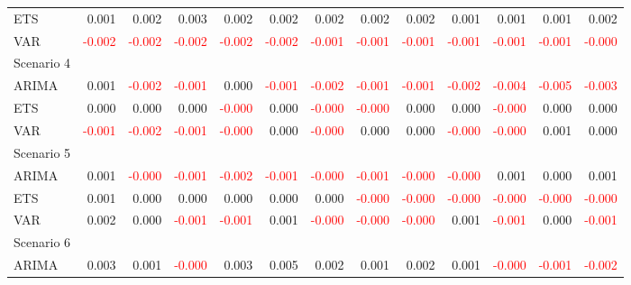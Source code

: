 \begin{table}[!htb]
{\begin{tabular}{lrrrrrrrrrrrr}
      ETS & 0.001 & 0.002 & 0.003 & 0.002 & 0.002 & 0.002 & 0.002 & 0.002 & 0.001 & 0.001 & 0.001 & 0.002 \\
      VAR & \textcolor{red}{-0.002} & \textcolor{red}{-0.002} & \textcolor{red}{-0.002} & \textcolor{red}{-0.002} & \textcolor{red}{-0.002} & \textcolor{red}{-0.001} & \textcolor{red}{-0.001} & \textcolor{red}{-0.001} & \textcolor{red}{-0.001} & \textcolor{red}{-0.001} & \textcolor{red}{-0.001} & \textcolor{red}{-0.000} \\
      \hline
      Scenario 4 & & & & & & & & & & & & \\
      \hline
      ARIMA & 0.001 & \textcolor{red}{-0.002} & \textcolor{red}{-0.001} & 0.000 & \textcolor{red}{-0.001} & \textcolor{red}{-0.002} & \textcolor{red}{-0.001} & \textcolor{red}{-0.001} & \textcolor{red}{-0.002} & \textcolor{red}{-0.004} & \textcolor{red}{-0.005} & \textcolor{red}{-0.003} \\
      ETS & 0.000 & 0.000 & 0.000 & \textcolor{red}{-0.000} & 0.000 & \textcolor{red}{-0.000} & \textcolor{red}{-0.000} & 0.000 & 0.000 & \textcolor{red}{-0.000} & 0.000 & 0.000 \\
      VAR & \textcolor{red}{-0.001} & \textcolor{red}{-0.002} & \textcolor{red}{-0.001} & \textcolor{red}{-0.000} & 0.000 & \textcolor{red}{-0.000} & 0.000 & 0.000 & \textcolor{red}{-0.000} & \textcolor{red}{-0.000} & 0.001 & 0.000 \\
      \hline
      Scenario 5 & & & & & & & & & & & & \\
      \hline
      ARIMA & 0.001 & \textcolor{red}{-0.000} & \textcolor{red}{-0.001} & \textcolor{red}{-0.002} & \textcolor{red}{-0.001} & \textcolor{red}{-0.000} & \textcolor{red}{-0.001} & \textcolor{red}{-0.000} & \textcolor{red}{-0.000} & 0.001 & 0.000 & 0.001 \\
      ETS & 0.001 & 0.000 & 0.000 & 0.000 & 0.000 & 0.000 & \textcolor{red}{-0.000} & \textcolor{red}{-0.000} & \textcolor{red}{-0.000} & \textcolor{red}{-0.000} & \textcolor{red}{-0.000} & \textcolor{red}{-0.000} \\
      VAR & 0.002 & 0.000 & \textcolor{red}{-0.001} & \textcolor{red}{-0.001} & 0.001 & \textcolor{red}{-0.000} & \textcolor{red}{-0.000} & \textcolor{red}{-0.000} & 0.001 & \textcolor{red}{-0.001} & 0.000 & \textcolor{red}{-0.001} \\
      \hline
      Scenario 6 & & & & & & & & & & & & \\
      \hline
      ARIMA & 0.003 & 0.001 & \textcolor{red}{-0.000} & 0.003 & 0.005 & 0.002 & 0.001 & 0.002 & 0.001 & \textcolor{red}{-0.000} & \textcolor{red}{-0.001} & \textcolor{red}{-0.002} \\

\end{tabular}}
\end{table}
